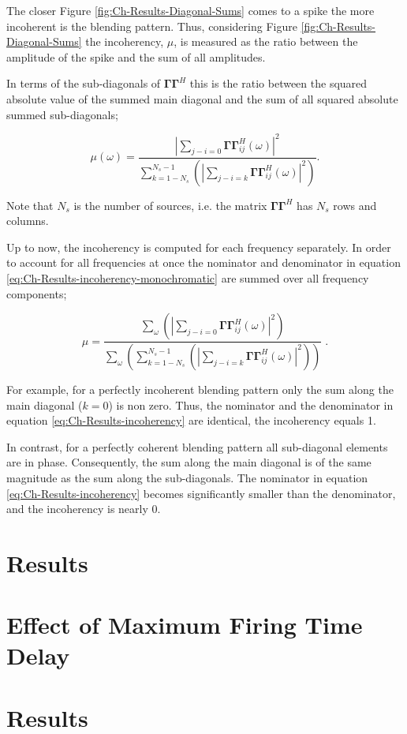 The closer Figure \ref{fig:Ch-Results-Diagonal-Sums} comes to a spike the more incoherent is the blending pattern. Thus, considering Figure \ref{fig:Ch-Results-Diagonal-Sums} the incoherency, $\mu$, is measured as the ratio between the amplitude of the spike and the sum of all amplitudes. 

In terms of the sub-diagonals of $\mathbf{\Gamma \Gamma}^H$ this is the ratio between the squared absolute value of the summed main diagonal and the sum of all squared absolute summed sub-diagonals;

\begin{equation}
	\mu(\omega) = \frac{  \left| \sum_{j-i = 0} \mathbf{\Gamma \Gamma}^H_{ij} (\omega) \right|^2    }{ \sum_{k = 1-N_s}^{N_s-1}	 \left( \left| \sum_{j-i = k} \mathbf{\Gamma \Gamma}^H_{ij} (\omega) \right|^2 \right)   }.
	\label{eq:Ch-Results-incoherency-monochromatic}
\end{equation}

Note that $N_s$ is the number of sources, i.e. the matrix $\mathbf{\Gamma \Gamma}^H$ has $N_s$ rows and columns.

Up to now, the incoherency is computed for each frequency separately. In order to account for all frequencies at once the nominator and denominator in equation \ref{eq:Ch-Results-incoherency-monochromatic} are summed over all frequency components;

\begin{equation}
	\mu = \frac{  \sum_{\omega} \left( \left| \sum_{j-i = 0} \mathbf{\Gamma \Gamma}^H_{ij} (\omega) \right|^2  \right)  }{  \sum_{\omega} \left( \sum_{k = 1-N_s}^{N_s-1}	 \left( \left| \sum_{j-i = k} \mathbf{\Gamma \Gamma}^H_{ij} (\omega) \right|^2 \right) \right)  } \;.
	\label{eq:Ch-Results-incoherency2}
\end{equation}



For example, for a perfectly incoherent blending pattern only the sum along the main diagonal ($k=0$) is non zero. Thus, the nominator and the denominator in equation \ref{eq:Ch-Results-incoherency} are identical, the incoherency equals 1. 

In contrast, for a perfectly coherent blending pattern all sub-diagonal elements are in phase. Consequently, the sum along the main diagonal is of the same magnitude as the sum along the sub-diagonals. The nominator in equation \ref{eq:Ch-Results-incoherency} becomes significantly smaller than the denominator, and the incoherency is nearly 0.


\section{Results}

\section{Effect of Maximum Firing Time Delay}

\section{Results}


